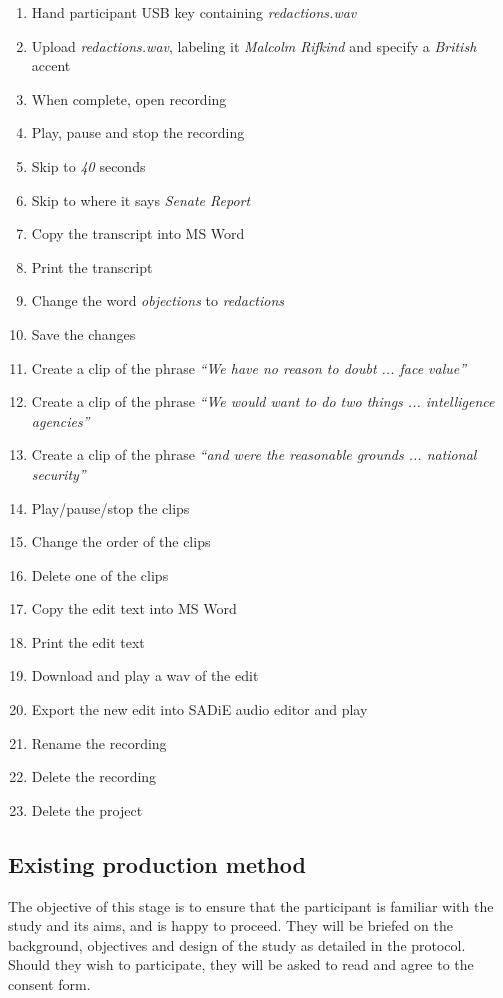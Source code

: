 \begin{enumerate}
\setlength\itemsep{0em}
\item Hand participant USB key containing \textit{redactions.wav}
\item Upload \textit{redactions.wav}, labeling it \textit{Malcolm Rifkind} and
  specify a \textit{British} accent
\item When complete, open recording
\item Play, pause and stop the recording
\item Skip to \textit{40} seconds
\item Skip to where it says \textit{Senate Report}
\item Copy the transcript into MS Word
\item Print the transcript
\item Change the word \textit{objections} to \textit{redactions} 
\item Save the changes
\item Create a clip of the phrase \textit{``We have no reason to doubt ... face
    value''}
\item Create a clip of the phrase \textit{``We would want to do two things ...
    intelligence agencies''}
\item Create a clip of the phrase \textit{``and were the reasonable grounds ...
    national security''}
\item Play/pause/stop the clips
\item Change the order of the clips
\item Delete one of the clips
\item Copy the edit text into MS Word
\item Print the edit text
\item Download and play a wav of the edit
\item Export the new edit into SADiE audio editor and play
\item Rename the recording
\item Delete the recording
\item Delete the project
\end{enumerate}

\subsection{Existing production method}
The objective of this stage is to ensure that the participant is familiar with
the study and its aims, and is happy to proceed. They will be briefed on the
background, objectives and design of the study as detailed in the protocol.
Should they wish to participate, they will be asked to read and agree to the
consent form.

